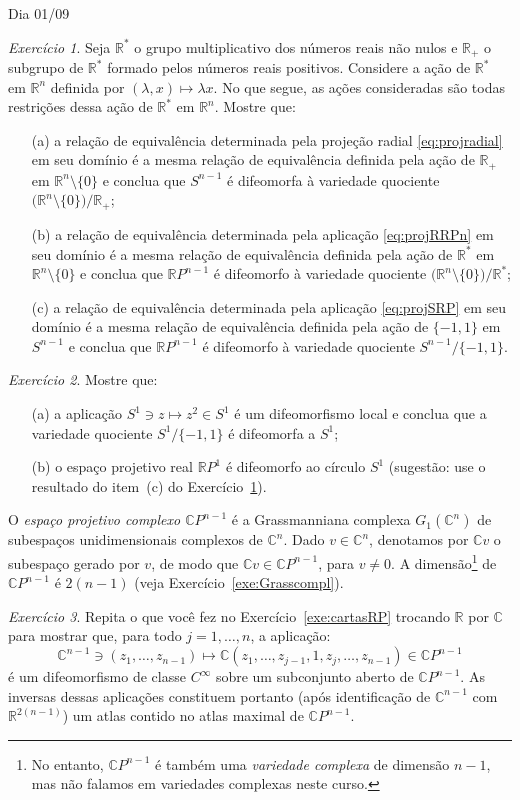 \documentclass[oneside,11pt]{amsart}
\newcommand{\R}{\mathds R}
\newcommand{\C}{\mathds C}
\theoremstyle{remark}\newtheorem{exercise}{Exercício}[section]
\theoremstyle{plain}\newtheorem{teo}{Teorema}[section]
\theoremstyle{plain}\newtheorem{lem}[teo]{Lema}
\theoremstyle{plain}\newtheorem{prop}[teo]{Proposição}
\theoremstyle{definition}\newtheorem{defin}[teo]{Definição}
\theoremstyle{remark}\newtheorem{rem}[teo]{Observação}
\theoremstyle{definition}\newtheorem{example}[teo]{Exemplo}
\numberwithin{equation}{section}
\begin{document}
\begin{section}{Dia 01/09}
\begin{exercise}\label{exe:quocRP}
Seja $\R^*$ o grupo multiplicativo dos números reais não nulos e $\R_+$ o subgrupo de $\R^*$ formado pelos números reais positivos.
Considere a ação de $\R^*$ em $\R^n$ definida por $(\lambda,x)\mapsto\lambda x$. No que segue, as ações consideradas são todas restrições
dessa ação de $\R^*$ em $\R^n$. Mostre que:
\begin{itemize}
\item[(a)] a relação de equivalência determinada pela projeção radial \eqref{eq:projradial} em seu domínio é a mesma relação de equivalência
definida pela ação de $\R_+$ em $\R^n\setminus\{0\}$ e conclua que $S^{n-1}$ é difeomorfa à variedade quociente $\big(\R^n\setminus\{0\}\big)/\R_+$;
\item[(b)] a relação de equivalência determinada pela aplicação \eqref{eq:projRRPn} em seu domínio é a mesma relação de equivalência definida pela
ação de $\R^*$ em $\R^n\setminus\{0\}$ e conclua que $\R P^{n-1}$ é difeomorfo à variedade quociente $\big(\R^n\setminus\{0\}\big)/\R^*$;
\item[(c)] a relação de equivalência determinada pela aplicação \eqref{eq:projSRP} em seu domínio é a mesma relação de equivalência definida pela
ação de $\{-1,1\}$ em $S^{n-1}$ e conclua que $\R P^{n-1}$ é difeomorfo à variedade quociente $S^{n-1}/\{-1,1\}$.
\end{itemize}
\end{exercise}

\begin{exercise}\label{exe:RP1S1}
Mostre que:
\begin{itemize}
\item[(a)] a aplicação $S^1\ni z\mapsto z^2\in S^1$ é um difeomorfismo local e conclua que a variedade quociente
$S^1/\{-1,1\}$ é difeomorfa a $S^1$;
\item[(b)] o espaço projetivo real $\R P^1$ é difeomorfo ao círculo $S^1$ (sugestão: use o resultado do item~(c)
do Exercício~\ref{exe:quocRP}).
\end{itemize}
\end{exercise}

O {\em espaço projetivo complexo $\C P^{n-1}$\/} é a Grassmanniana complexa $G_1(\C^n)$ de subespaços unidimensionais complexos
de $\C^n$. Dado $v\in\C^n$, denotamos por $\C v$ o subespaço gerado por $v$, de modo que $\C v\in\C P^{n-1}$, para $v\ne0$.
A dimensão\footnote{%
No entanto, $\C P^{n-1}$ é também uma {\em variedade complexa\/} de dimensão $n-1$, mas não falamos em
variedades complexas neste curso.} de $\C P^{n-1}$ é $2(n-1)$ (veja Exercício~\ref{exe:Grasscompl}).
\begin{exercise}\label{exe:cartasCP}
Repita o que você fez no Exercício~\ref{exe:cartasRP} trocando $\R$ por $\C$ para mostrar que, para todo
$j=1,\ldots,n$, a aplicação:
\[\C^{n-1}\ni(z_1,\ldots,z_{n-1})\longmapsto\C(z_1,\ldots,z_{j-1},1,z_j,\ldots,z_{n-1})\in\C P^{n-1}\]
é um difeomorfismo de classe $C^\infty$ sobre um subconjunto aberto de $\C P^{n-1}$. As inversas dessas aplicações
constituem portanto (após identificação de $\C^{n-1}$ com $\R^{2(n-1)}$) um atlas contido no atlas maximal de $\C P^{n-1}$.
\end{exercise}


\end{section}
\end{document}

